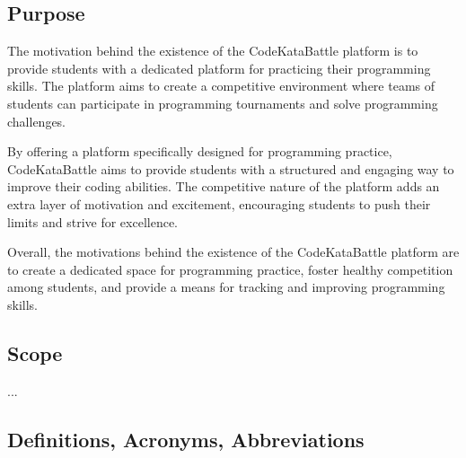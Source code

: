\setlength{\headheight}{13.59999pt}
\addtolength{\topmargin}{-1.59999pt}

\subsection{Purpose}
The motivation behind the existence of the CodeKataBattle platform is to provide students with a dedicated platform for practicing their programming skills. The platform aims to create a competitive environment where teams of students can participate in programming tournaments and solve programming challenges.

By offering a platform specifically designed for programming practice, CodeKataBattle aims to provide students with a structured and engaging way to improve their coding abilities. The competitive nature of the platform adds an extra layer of motivation and excitement, encouraging students to push their limits and strive for excellence.

Overall, the motivations behind the existence of the CodeKataBattle platform are to create a dedicated space for programming practice, foster healthy competition among students, and provide a means for tracking and improving programming skills.

\subsection{Scope}
...

\subsection{Definitions, Acronyms, Abbreviations}
